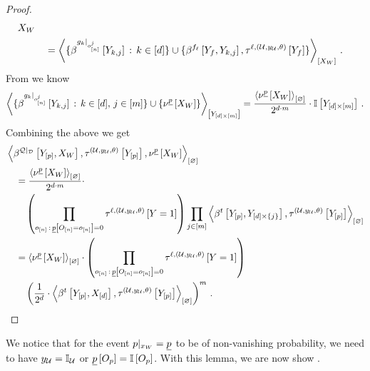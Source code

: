 \begin{proof}
\begin{align*}
{        }{\worldvariables} \\
        & \quad =
        \contractionof{
            \{\bencodingofat{\groundingofwrt{\extformulaof{\atomenumerator}}{\sampleind}}{\headvariableof{\atomenumerator,\datindex}} \wcols \atomenumeratorin \}
            \cup \{\bencodingofat{\enumformula}{\formulavar,\headvariableof{\atomenumerator,\datindex}},\hypercoreofat{\selindex,\hybridparam}{\formulavar}\}
        }{\worldvariables} \, .
    \end{align*}
    From  we know
    \begin{align*}
        \contractionof{
            \{\bencodingofat{\groundingofwrt{\extformulaof{\atomenumerator}}{\sampleind}}{\headvariableof{\atomenumerator,\datindex}}
            \wcols \atomenumeratorin \ncond \datindexin \} \cup \{\fixedimpbm\}
        }{\headvariableof{[\atomorder]\times[\datanum]}}
        = \frac{\contraction{\fixedimpbm}}{2^{\atomorder\cdot\datanum}} \cdot \onesat{\headvariableof{[\atomorder]\times[\datanum]}} \, .
    \end{align*}
    Combining the above we get
    \begin{align*}
        &\contraction{
            \bencodingofat{\restfolformulaset}{\headvariables,\worldvariables},\hypercoreofat{\hybridparam}{\headvariables},\fixedimpbm
        } \\
        &\quad=
        \frac{\contraction{\fixedimpbm}}{2^{\atomorder\cdot\datanum}} \cdot \\
        &\quad\quad \left(  \prod_{\shortindindices\wcols\fixedimpformulaat{\indexedshortindvariables}=0} \hypercoreofat{\selindex,\hybridparam}{\headvariable=1}\right)
        \prod_{\datindexin}\contraction{
            \bencodingofat{\hlnstat}{\headvariables,\headvariableof{[\atomorder]\times\{\datindex\}}},\hypercoreofat{\hybridparam}{\headvariables}
        } \\
        &\quad=\contraction{\fixedimpbm} \cdot
        \left(  \prod_{\shortindindices\wcols\fixedimpformulaat{\indexedshortindvariables}=0} \hypercoreofat{\selindex,\hybridparam}{\headvariable=1}\right) \\
        &\quad\quad \left(\frac{1}{2^{\atomorder}}
        \cdot \contraction{\hlnstatccwith,\hypercoreofat{\hybridparam}{\headvariables}}
        \right)^{\datanum} \, . \qedhere
    \end{align*}
\end{proof}

We notice that for the event ${p}|_{x_{W}}=\underline{p}$ to be of non-vanishing probability, we need to have $y_{\mathcal{U}}=\mathbb{I}_{\mathcal{U}}$ or $\underline{p}\left[O_{p}\right]=\mathbb{I}\left[O_{p}\right]$.
With this lemma, we are now show .


